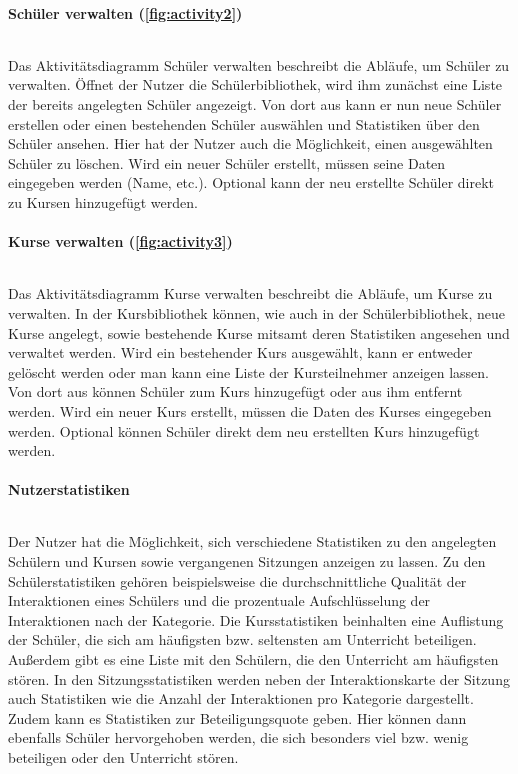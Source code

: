 \paragraph{Schüler verwalten (\autoref{fig:activity2})} $~$ 

Das Aktivitätsdiagramm \frqq Schüler verwalten\flqq{} beschreibt die Abläufe, um Schüler zu verwalten. Öffnet der Nutzer die Schülerbibliothek, wird ihm zunächst eine Liste der bereits angelegten Schüler angezeigt. Von dort aus kann er nun neue Schüler erstellen oder einen bestehenden Schüler auswählen und Statistiken über den Schüler ansehen. Hier hat der Nutzer auch die Möglichkeit, einen ausgewählten Schüler zu löschen. Wird ein neuer Schüler erstellt, müssen seine Daten eingegeben werden (Name, etc.). Optional kann der neu erstellte Schüler direkt zu Kursen hinzugefügt werden.

\paragraph{Kurse verwalten (\autoref{fig:activity3})} $~$ 

Das Aktivitätsdiagramm \frqq Kurse verwalten\flqq{} beschreibt die Abläufe, um Kurse zu verwalten. In der Kursbibliothek können, wie auch in der Schülerbibliothek, neue Kurse angelegt, sowie bestehende Kurse mitsamt deren Statistiken angesehen und verwaltet werden. Wird ein bestehender Kurs ausgewählt, kann er entweder gelöscht werden oder man kann eine Liste der Kursteilnehmer anzeigen lassen. Von dort aus können Schüler zum Kurs hinzugefügt oder aus ihm entfernt werden. Wird ein neuer Kurs erstellt, müssen die Daten des Kurses eingegeben werden. Optional können Schüler direkt dem neu erstellten Kurs hinzugefügt werden.

\paragraph{Nutzerstatistiken} $~$ 

Der Nutzer hat die Möglichkeit, sich verschiedene Statistiken zu den angelegten Schülern und Kursen sowie vergangenen Sitzungen anzeigen zu lassen. Zu den Schülerstatistiken gehören beispielsweise die durchschnittliche Qualität der Interaktionen eines Schülers und die prozentuale Aufschlüsselung der Interaktionen nach der Kategorie. Die Kursstatistiken beinhalten eine Auflistung der Schüler, die sich am häufigsten bzw. seltensten am Unterricht beteiligen. Außerdem gibt es eine Liste mit den Schülern, die den Unterricht am häufigsten stören. In den Sitzungsstatistiken werden neben der Interaktionskarte der Sitzung auch Statistiken wie die Anzahl der Interaktionen pro Kategorie dargestellt. Zudem kann es Statistiken zur Beteiligungsquote geben. Hier können dann ebenfalls Schüler hervorgehoben werden, die sich besonders viel bzw. wenig beteiligen oder den Unterricht stören.



